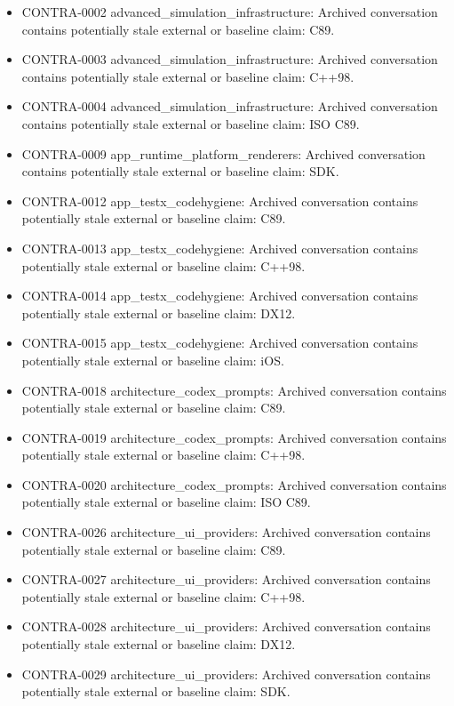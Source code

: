 \documentclass[11pt,a4paper]{report}
\begin{document}
\begin{itemize}
\item CONTRA-0002 advanced\_simulation\_infrastructure: Archived conversation contains potentially stale external or baseline claim: C89.
\item CONTRA-0003 advanced\_simulation\_infrastructure: Archived conversation contains potentially stale external or baseline claim: C++98.
\item CONTRA-0004 advanced\_simulation\_infrastructure: Archived conversation contains potentially stale external or baseline claim: ISO C89.
\item CONTRA-0009 app\_runtime\_platform\_renderers: Archived conversation contains potentially stale external or baseline claim: SDK.
\item CONTRA-0012 app\_testx\_codehygiene: Archived conversation contains potentially stale external or baseline claim: C89.
\item CONTRA-0013 app\_testx\_codehygiene: Archived conversation contains potentially stale external or baseline claim: C++98.
\item CONTRA-0014 app\_testx\_codehygiene: Archived conversation contains potentially stale external or baseline claim: DX12.
\item CONTRA-0015 app\_testx\_codehygiene: Archived conversation contains potentially stale external or baseline claim: iOS.
\item CONTRA-0018 architecture\_codex\_prompts: Archived conversation contains potentially stale external or baseline claim: C89.
\item CONTRA-0019 architecture\_codex\_prompts: Archived conversation contains potentially stale external or baseline claim: C++98.
\item CONTRA-0020 architecture\_codex\_prompts: Archived conversation contains potentially stale external or baseline claim: ISO C89.
\item CONTRA-0026 architecture\_ui\_providers: Archived conversation contains potentially stale external or baseline claim: C89.
\item CONTRA-0027 architecture\_ui\_providers: Archived conversation contains potentially stale external or baseline claim: C++98.
\item CONTRA-0028 architecture\_ui\_providers: Archived conversation contains potentially stale external or baseline claim: DX12.
\item CONTRA-0029 architecture\_ui\_providers: Archived conversation contains potentially stale external or baseline claim: SDK.

\end{itemize}
\end{document}
